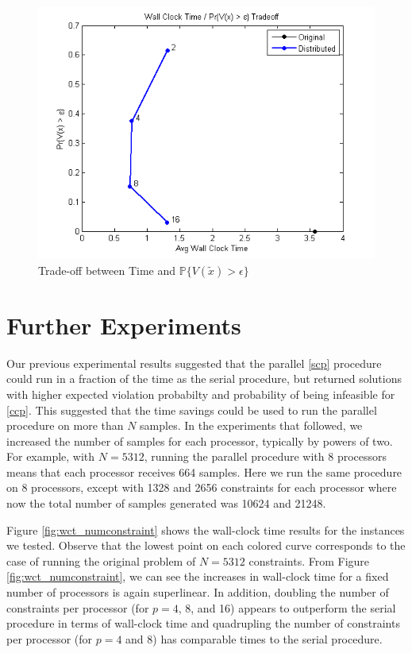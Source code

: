 \documentclass[12pt]{article}
\begin{document}
\begin{figure}[ht]
	\centering
		\includegraphics[scale=0.9]{../plot/figs/wct_probviolprobgreateps_frontier.png}
	\caption{Trade-off between Time and $\mathbb{P}\{V(\tilde{x}) > \epsilon \}$}
	\label{fig:wct_probviolprobgreateps_frontier}
\end{figure}

\section*{Further Experiments}

Our previous experimental results suggested that the parallel \ref{scp} procedure could run in a fraction of the time as the serial procedure, but returned solutions with higher expected violation probabilty and probability of being infeasible for \ref{ccp}.
This suggested that the time savings could be used to run the parallel procedure on more than $N$ samples.
In the experiments that followed, we increased the number of samples for each processor, typically by powers of two.
For example, with $N = 5312$, running the parallel procedure with 8 processors means that each processor receives 664 samples.
Here we run the same procedure on 8 processors, except with 1328 and 2656 constraints for each processor where now the total number of samples generated was 10624 and 21248.

Figure \ref{fig:wct_numconstraint} shows the wall-clock time results for the instances we tested.
Observe that the lowest point on each colored curve corresponds to the case of running the original problem of $N = 5312$ constraints.
From Figure \ref{fig:wct_numconstraint}, we can see the increases in wall-clock time for a fixed number of processors is again superlinear.
In addition, doubling the number of constraints per processor (for $p =4$, 8, and 16) appears to outperform the serial procedure in terms of wall-clock time and quadrupling the number of constraints per processor (for $p = 4$ and 8) has comparable times to the serial procedure.
\end{document}
